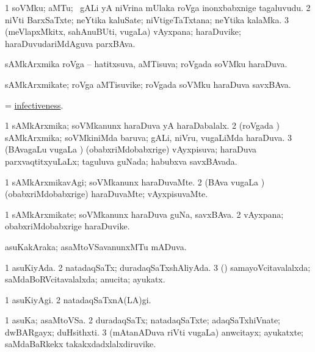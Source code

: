 \bentry
{}
\gl{\nA}
\bmng
\bnum
\num{1} soVMku; aMTu; \sA\ gALi yA niVrina mUlaka roVga inonxbabxnige tagaluvudu. 
\num{2} niVti BarxSaTxte; neYtika kaluSate; niVtigeTaTxtana; neYtika kalaMka. 
\num{3} (meVlapxMkitx, sahAnuBUti, \mo vugaLa) vAyxpana; haraDuvike; haraDuvudariMdAguva parxBAva. 
\enum
\emng
\eentry

\bentry
{}
\gl{\gu}
\bmng
sAMkArxmika roVga -- hatitxsuva, aMTisuva; roVgada soVMku haraDuva. 
\emng
\eentry

\bentry
{}
\gl{\nA}
\bmng
sAMkArxmikate; roVga aMTisuvike; roVgada soVMku haraDuva savxBAva. 
\emng
\eentry

\bentry
{}
\gl{\nA}
\bmng
 = \hyperlink{infectiveness}{infectiveness}. 
\emng
\eentry

\bentry
{}
\gl{\gu}
\bmng
\bnum
\num{1} sAMkArxmika; soVMkanunx haraDuva yA haraDabalalx. 
\num{2} (roVgada \vi) sAMkArxmika; soVMkiniMda baruva; gALi, niVru, \mo vugaLiMda haraDuva. 
\num{3} (BAvagaLu \mo vugaLa \vi) (obabxriMdobabxrige) vAyxpisuva; haraDuva parxvaqtitxyuLaLx; taguluva guNada; habubxva savxBAvada. 
\enum
\emng
\eentry

\bentry
{}
\gl{\kirxvi}
\bmng
\bnum
\num{1} sAMkArxmikavAgi; soVMkanunx haraDuvaMte. 
\num{2} (BAva \mo vugaLa \vi) (obabxriMdobabxrige) haraDuvaMte; vAyxpisuvaMte. 
\enum
\emng
\eentry

\bentry
{}
\gl{\nA}
\bmng
\bnum
\num{1} sAMkArxmikate; soVMkanunx haraDuva guNa, savxBAva. 
\num{2} vAyxpana; obabxriMdobabxrige haraDuvike. 
\enum
\emng
\eentry

\bentry
{}
\gl{\gu}
\bmng
asuKakAraka; asaMtoVSavanunxMTu mADuva. 
\emng
\eentry

\bentry
{}
\gl{\gu}
\bmng
\bnum
\num{1} asuKiyAda. 
\num{2} natadaqSaTx; duradaqSaTxshAliyAda. 
\num{3} (\kanmu) samayoVcitavalalxda; saMdaBoRVcitavalalxda; anucita; ayukatx. 
\enum
\emng
\eentry

\bentry
{}
\gl{\kirxvi}
\bmng
\bnum
\num{1} asuKiyAgi. 
\num{2} natadaqSaTxnA(LA)gi. 
\enum
\emng
\eentry

\bentry
{}
\gl{\gu}
\bmng
\bnum
\num{1} asuKa; asaMtoVSa. 
\num{2} duradaqSaTx; natadaqSaTxte; adaqSaTxhiVnate; dwBARgayx; duHsithxti. 
\num{3} (mAtanADuva riVti \mo vugaLa) anwcitayx; ayukatxte; saMdaBaRkekx takakxdadxlalxdiruvike. 
\enum
\emng
\eentry

